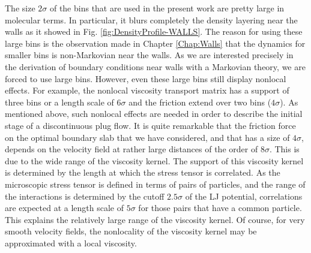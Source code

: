 \documentclass[b5paper,openright,10pt]{book}
\begin{document}
The size $2\sigma$ of  the bins that are used in  the present work are
pretty large in  molecular terms.  In particular,  it blurs completely
the density layering near the walls as it showed in Fig. \ref{fig:DensityProfile-WALLS}.  The reason for using these large
bins is the observation made in Chapter \ref{Chap:Walls} that the dynamics for smaller
bins is non-Markovian  near the walls. As we  are interested precisely
in the derivation  of boundary conditions near walls  with a Markovian
theory, we  are forced to  use large  bins. However, even  these large
bins  still display  nonlocal  effects.  For  example, the  nonlocal
viscosity transport  matrix has a  support of  three bins or  a length
scale of $6\sigma$ and the  friction extend over two bins ($4\sigma$).
As  mentioned above,  such nonlocal  effects are  needed in  order to
describe the initial stage of a  discontinuous plug flow.  It is quite
remarkable that the  friction force on the optimal  boundary slab that
we have considered,  and that has a size of  $4\sigma$, depends on the
velocity   field  at   rather  large   distances  of   the  order   of
$8\sigma$. This is  due to the wide range of  the viscosity kernel. 
The support of this viscosity  kernel is determined by the length
at which  the stress tensor  is correlated. As the  microscopic stress
tensor is defined in terms of pairs of particles, and the range of the
interactions  is   determined  by   the  cutoff  $2.5\sigma$   of  the
LJ potential,  correlations are expected at  a length scale
of  $5\sigma$ for  those  pairs  that have  a  common particle.   This
explains  the  relatively large  range  of  the viscosity  kernel.  Of
course,  for very  smooth  velocity fields,  the  nonlocality of  the
viscosity kernel may be approximated with a local viscosity.





\end{document}
